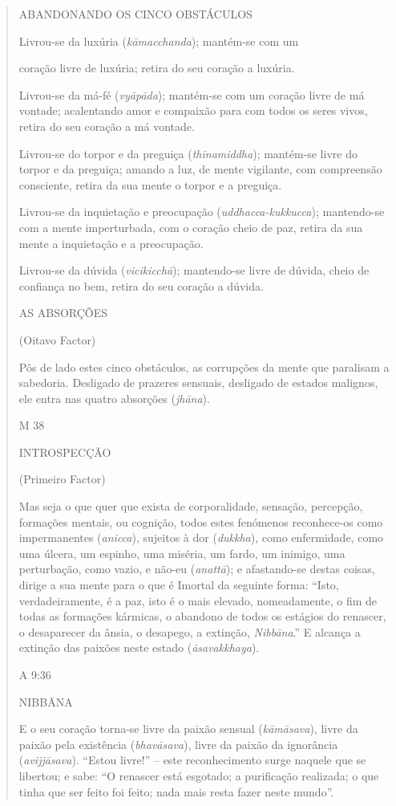 \begin{quote}
ABANDONANDO OS CINCO OBSTÁCULOS

Livrou-se da luxúria (\emph{kāmacchanda}); mantém-se com um

coração livre de luxúria; retira do seu coração a luxúria.

Livrou-se da má-fé (\emph{vyāpāda}); mantém-se com um coração livre de má vontade; acalentando amor e compaixão para com todos os seres vivos, retira do seu coração a má vontade.

Livrou-se do torpor e da preguiça (\emph{thīnamiddha}); mantém-se livre do torpor e da preguiça; amando a luz, de mente vigilante, com compreensão consciente, retira da sua mente o torpor e a preguiça.

Livrou-se da inquietação e preocupação (\emph{uddhacca-kukkucca}); mantendo-se com a mente imperturbada, com o coração cheio de paz, retira da sua mente a inquietação e a preocupação.

Livrou-se da dúvida (\emph{vicikicchā}); mantendo-se livre de dúvida, cheio de confiança no bem, retira do seu coração a dúvida.

AS ABSORÇÕES

(Oitavo Factor)

Pôs de lado estes cinco obstáculos, as corrupções da mente que paralisam a sabedoria. Desligado de prazeres sensuais, desligado de estados malignos, ele entra nas quatro absorções (\emph{jhāna}).

M 38

INTROSPECÇÃO

(Primeiro Factor)

Mas seja o que quer que exista de corporalidade, sensação, percepção, formações mentais, ou cognição, todos estes fenómenos reconhece-os como impermanentes (\emph{anicca}), sujeitos à dor (\emph{dukkha}), como enfermidade, como uma úlcera, um espinho, uma miséria, um fardo, um inimigo, uma perturbação, como vazio, e não-eu (\emph{anattā}); e afastando-se destas coisas, dirige a sua mente para o que é Imortal da seguinte forma: ``Isto, verdadeiramente, é a paz, isto é o mais elevado, nomeadamente, o fim de todas as formações kármicas, o abandono de todos os estágios do renascer, o desaparecer da ânsia, o desapego, a extinção, \emph{Nibbāna}.'' E alcança a extinção das paixões neste estado (\emph{āsavakkhaya}).

A 9:36

NIBBĀNA

E o seu coração torna-se livre da paixão sensual (\emph{kāmāsava}), livre da paixão pela existência (\emph{bhavāsava}), livre da paixão da ignorância (\emph{avijjāsava}). ``Estou livre!'' -- este reconhecimento surge naquele que se libertou; e sabe: ``O renascer está esgotado; a purificação realizada; o que tinha que ser feito foi feito; nada mais resta fazer neste mundo''.


\end{quote}
